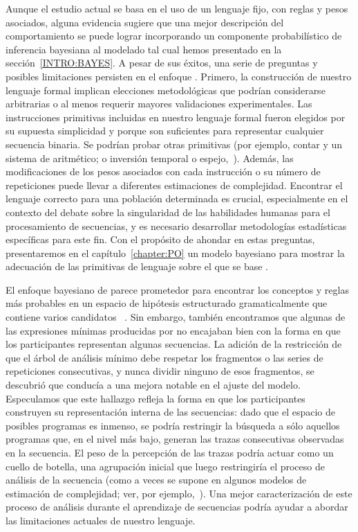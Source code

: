 Aunque el estudio actual se basa en el uso de un lenguaje fijo, con reglas y pesos asociados, alguna evidencia sugiere que una mejor descripción del comportamiento se puede lograr incorporando un componente probabilístico de inferencia bayesiana al modelado tal cual hemos presentado en la sección~\ref{INTRO:BAYES}. A pesar de sus éxitos, una serie de preguntas y posibles limitaciones persisten en el enfoque \lot. Primero, la construcción de nuestro lenguaje formal implican elecciones metodológicas que podrían considerarse arbitrarias o al menos requerir mayores validaciones experimentales. Las instrucciones primitivas incluidas en nuestro lenguaje formal fueron elegidos por su supuesta simplicidad y porque son suficientes para representar cualquier secuencia binaria. Se podrían probar otras primitivas (por ejemplo, contar y un sistema de aritmético; o inversión temporal o espejo,~\cite{f10}). Además, las modificaciones de los pesos asociados con cada instrucción o su número de repeticiones puede llevar a diferentes estimaciones de complejidad. Encontrar el lenguaje correcto para una población determinada es crucial, especialmente en el contexto del debate sobre la singularidad de las habilidades humanas para el procesamiento de secuencias, y es necesario desarrollar metodologías estadísticas específicas para este fin. Con el propósito de ahondar en estas preguntas, presentaremos en el capítulo~\ref{chapter:PO} un modelo bayesiano para mostrar la adecuación de las primitivas de lenguaje \gramgeo sobre el que se base \grambin. 

El enfoque bayesiano de \lot parece prometedor para encontrar los conceptos y reglas más probables en un espacio de hipótesis estructurado gramaticalmente que contiene varios candidatos ~\cite{goodman2008rational,piantadosi2016four,romano2018bayesian}. Sin embargo, también encontramos que algunas de las expresiones mínimas producidas por \grambin no encajaban bien con la forma en que los participantes representan algunas secuencias. La adición de la restricción de que el árbol de análisis mínimo debe respetar los fragmentos o las series de repeticiones consecutivas, y nunca dividir ninguno de esos fragmentos, se descubrió que conducía a una mejora notable en el ajuste del modelo. Especulamos que este hallazgo refleja la forma en que los participantes construyen su representación interna de las secuencias: dado que el espacio de posibles programas es inmenso, se podría restringir la búsqueda a sólo aquellos programas que, en el nivel más bajo, generan las trazas consecutivas observadas en la secuencia. El peso de la percepción de las trazas podría actuar como un cuello de botella, una agrupación inicial que luego restringiría el proceso de análisis de la secuencia (como a veces se supone en algunos modelos de estimación de complejidad; ver, por ejemplo,~\cite{f98}). Una mejor caracterización de este proceso de análisis durante el aprendizaje de secuencias podría ayudar a abordar las limitaciones actuales de nuestro lenguaje.

